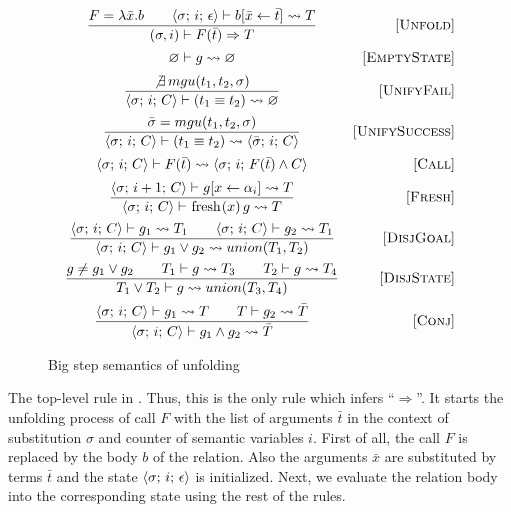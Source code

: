 \begin{figure}[h!]
\[\begin{array}{cr}

\dfrac{ F = \lambda \bar{x}. b \qquad \inbr{\sigma;\, i;\, \epsilon} \vdash b[\bar{x} \leftarrow \bar{t}] \leadsto T}
      {(\sigma, i) \vdash F(\bar{t}) \Rightarrow T}
&     \ruleno{Unfold} \\[4mm]
{\emptyset \vdash g \leadsto \emptyset}
&     \ruleno{EmptyState} \\[2mm]
\dfrac{\not\exists \, mgu(t_1, t_2, \sigma)}
      {\inbr{\sigma;\, i;\, C} \vdash (t_1 \equiv t_2) \leadsto \emptyset}
&     \ruleno{UnifyFail}  \\[4mm]
\dfrac{\bar\sigma = mgu(t_1, t_2, \sigma)}
      {\inbr{\sigma;\, i;\, C} \vdash (t_1 \equiv t_2) \leadsto \inbr{\bar\sigma;\, i;\, C}}
&     \ruleno{UnifySuccess}  \\[4mm]
      {\inbr{\sigma;\, i;\, C} \vdash F(\bar{t}) \leadsto \inbr{\sigma;\, i;\, F(\bar{t}) \land C}}
&     \ruleno{Call} \\[2mm]
\dfrac{\inbr{\sigma;\, i+1;\, C} \vdash g[x \leftarrow \alpha_i] \leadsto T}
      {\inbr{\sigma;\, i;\, C} \vdash \mbox{\lstinline|fresh|} (x)\, g \leadsto T}
&     \ruleno{Fresh}  \\[4mm]
\dfrac{\inbr{\sigma;\, i;\, C} \vdash g_1 \leadsto T_1 \qquad \inbr{\sigma;\, i;\, C} \vdash g_2 \leadsto T_1}
      {\inbr{\sigma;\, i;\, C} \vdash g_1 \lor g_2 \leadsto union(T_1, T_2)}
&     \ruleno{DisjGoal}  \\[4mm]
\dfrac{g \not= g_1 \lor g_2 \qquad T_1 \vdash g \leadsto T_3 \qquad T_2 \vdash g \leadsto T_4}
      {T_1 \lor T_2 \vdash g \leadsto union(T_3, T_4)}
&     \ruleno{DisjState}  \\[4mm]
\dfrac{\inbr{\sigma;\, i;\, C} \vdash g_1 \leadsto T \qquad T \vdash g_2 \leadsto \bar{T}}
      {\inbr{\sigma;\, i;\, C} \vdash g_1 \land g_2 \leadsto \bar{T}}
&     \ruleno{Conj}
\end{array}\]

\caption{Big step semantics of unfolding}
\label{fair:unfolding-semantics}
\end{figure}

The top-level rule in . Thus, this is the only rule which infers ``$\Rightarrow$''. It starts the unfolding process of call $F$
with the list of arguments $\bar{t}$ in the context of substitution $\sigma$ and counter of semantic variables $i$.
First of all, the call $F$ is replaced by the body $b$ of the relation. Also the arguments $\bar{x}$ are substituted by terms $\bar{t}$ and
the state $\langle \sigma;\, i;\, \epsilon \rangle$ is initialized. Next, we evaluate the relation body into the corresponding state using the rest of the rules.


